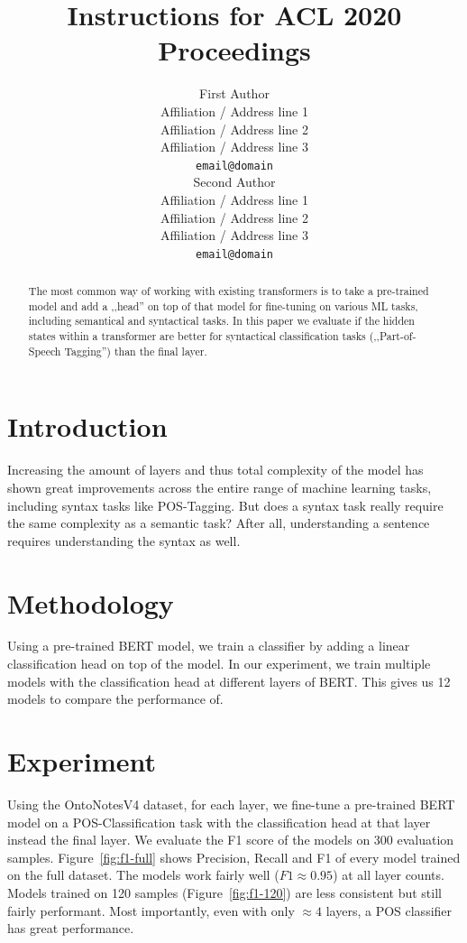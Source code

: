 \documentclass[11pt,a4paper]{article}
\title{Instructions for ACL 2020 Proceedings}
\author{First Author \\
  Affiliation / Address line 1 \\
  Affiliation / Address line 2 \\
  Affiliation / Address line 3 \\
  \texttt{email@domain} \\\And
  Second Author \\
  Affiliation / Address line 1 \\
  Affiliation / Address line 2 \\
  Affiliation / Address line 3 \\
  \texttt{email@domain} \\}
\date{}
\begin{document}
\maketitle
\begin{abstract}
The most common way of working with existing transformers is to take a pre-trained model and add a ,,head'' on top of
that model for fine-tuning on various ML tasks, including semantical and syntactical tasks. In this paper we evaluate if the hidden states within a transformer are better for syntactical classification tasks (,,Part-of-Speech Tagging'') than the final layer.
\end{abstract}

\section{Introduction}

Increasing the amount of layers and thus total complexity of the model has shown great improvements across the entire range of machine learning tasks, including syntax tasks like POS-Tagging. But does a syntax task really require the same complexity as a semantic task? After all, understanding a sentence requires understanding the syntax as well.

\section{Methodology}

Using a pre-trained BERT model, we train a classifier by adding a linear classification head on top of the model.
In our experiment, we train multiple models with the classification head at different layers of BERT. This gives us 12 models to compare the performance of.

\section{Experiment}

Using the OntoNotesV4 dataset, for each layer, we fine-tune a pre-trained BERT model on a POS-Classification task with the classification head at that layer instead the final layer. We evaluate the F1 score of the models on 300 evaluation samples. Figure~\ref{fig:f1-full} shows Precision, Recall and F1 of every model trained on the full dataset. The models work fairly well ($F1 \approx 0.95$) at all layer counts. Models trained on 120 samples (Figure~\ref{fig:f1-120}) are less consistent but still fairly performant. Most importantly, even with only $\approx 4$ layers, a POS classifier has great performance.
\end{document}
